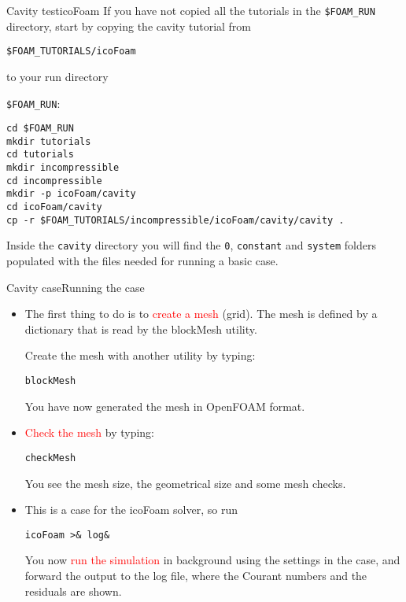 \documentclass{beamer}
\begin{document}
\begin{frame}[fragile]{Cavity test}{icoFoam}
If you have not copied all the tutorials in the \texttt{\$FOAM\_RUN} directory, start by copying the cavity tutorial from 
\begin{small}
\texttt{\$FOAM\_TUTORIALS/icoFoam} 
\end{small}
to your run directory 
\begin{small}
\texttt{\$FOAM\_RUN}:
\end{small}

\begin{footnotesize}
\begin{verbatim}
cd $FOAM_RUN
mkdir tutorials
cd tutorials
mkdir incompressible
cd incompressible
mkdir -p icoFoam/cavity
cd icoFoam/cavity
cp -r $FOAM_TUTORIALS/incompressible/icoFoam/cavity/cavity .
\end{verbatim}
\end{footnotesize}

Inside the \texttt{cavity} directory you will find the \texttt{0}, \texttt{constant} and \texttt{system} folders populated with the files needed for running a basic case.


\end{frame}

\begin{frame}{Cavity case}{Running the case}

\begin{itemize}
\item The first thing to do is to \textcolor{red}{create a mesh} (grid). The mesh is defined by a dictionary that is read by the blockMesh utility. 

Create the mesh with another utility by typing:

\texttt{blockMesh}

You have now generated the mesh in OpenFOAM format.
\item \textcolor{red}{Check the mesh} by typing:

\texttt{checkMesh}

You see the mesh size, the geometrical size and some mesh checks.
\item This is a case for the icoFoam solver, so run

\texttt{icoFoam >\& log\&}

You now \textcolor{red}{run the simulation} in background using the settings in the case, and
forward the output to the log file, where the Courant numbers and the residuals
are shown.

\end{itemize}

\end{frame}
\end{document}
